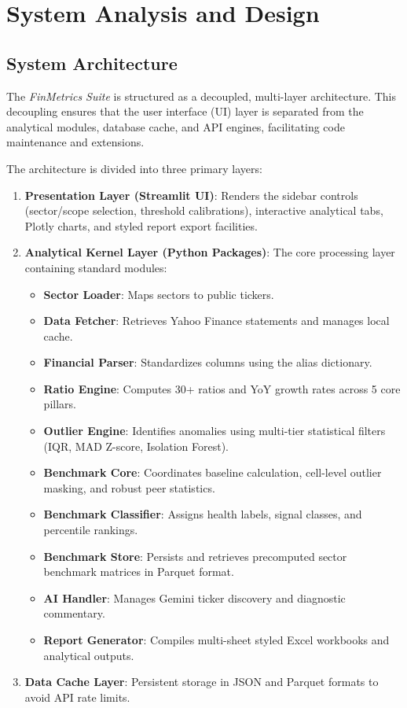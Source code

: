 \chapter{System Analysis and Design}
\label{ch:design}

\section{System Architecture}
The \textit{FinMetrics Suite} is structured as a decoupled, multi-layer architecture. This decoupling ensures that the user interface (UI) layer is separated from the analytical modules, database cache, and API engines, facilitating code maintenance and extensions.

The architecture is divided into three primary layers:
\begin{enumerate}
    \item \textbf{Presentation Layer (Streamlit UI)}: Renders the sidebar controls (sector/scope selection, threshold calibrations), interactive analytical tabs, Plotly charts, and styled report export facilities.
    \item \textbf{Analytical Kernel Layer (Python Packages)}: The core processing layer containing standard modules:
        \begin{itemize}
            \item \textbf{Sector Loader}: Maps sectors to public tickers.
            \item \textbf{Data Fetcher}: Retrieves Yahoo Finance statements and manages local cache.
            \item \textbf{Financial Parser}: Standardizes columns using the alias dictionary.
            \item \textbf{Ratio Engine}: Computes 30+ ratios and YoY growth rates across 5 core pillars.
            \item \textbf{Outlier Engine}: Identifies anomalies using multi-tier statistical filters (IQR, MAD Z-score, Isolation Forest).
            \item \textbf{Benchmark Core}: Coordinates baseline calculation, cell-level outlier masking, and robust peer statistics.
            \item \textbf{Benchmark Classifier}: Assigns health labels, signal classes, and percentile rankings.
            \item \textbf{Benchmark Store}: Persists and retrieves precomputed sector benchmark matrices in Parquet format.
            \item \textbf{AI Handler}: Manages Gemini ticker discovery and diagnostic commentary.
            \item \textbf{Report Generator}: Compiles multi-sheet styled Excel workbooks and analytical outputs.
        \end{itemize}
    \item \textbf{Data Cache Layer}: Persistent storage in JSON and Parquet formats to avoid API rate limits.
\end{enumerate}

